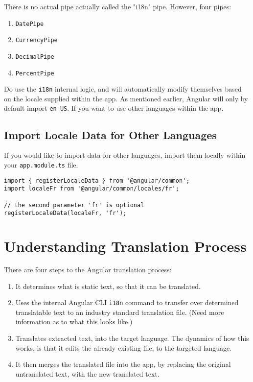 There is no actual pipe actually called the "i18n" pipe. However, four pipes: 
\begin{enumerate}
  \item \lstinline{DatePipe}
  \item \lstinline{CurrencyPipe}
  \item \lstinline{DecimalPipe}
  \item \lstinline{PercentPipe}
\end{enumerate}

Do use the \lstinline{i18n} internal logic, and will automatically modify 
themselves based on the locale supplied within the app. As mentioned earlier,
Angular will only by default import \lstinline{en-US}. If you want to use other
languages within the app. 

\subsection{Import Locale Data for Other Languages}
If you would like to import data for other languages, import them locally 
within your \lstinline{app.module.ts} file. 

\begin{lstlisting}[caption=app.module.ts]
import { registerLocaleData } from '@angular/common';
import localeFr from '@angular/common/locales/fr';

// the second parameter 'fr' is optional
registerLocaleData(localeFr, 'fr');
\end{lstlisting}

\section{ Understanding Translation Process }
There are four steps to the Angular translation process: 
\begin{enumerate}
  \item It determines what is static text, so that it can be translated.
  \item Uses the internal Angular CLI \lstinline{i18n} command to transfer over 
  determined translatable text to an industry standard translation file. (Need 
  more information as to what this looks like.)
  \item Translates extracted text, into the target language. The dynamics of
  how this works, is that it edits the already existing file, to the targeted 
  language. 
  \item It then merges the translated file into the app, by replacing the 
  original untranslated text, with the new translated text. 
\end{enumerate}

